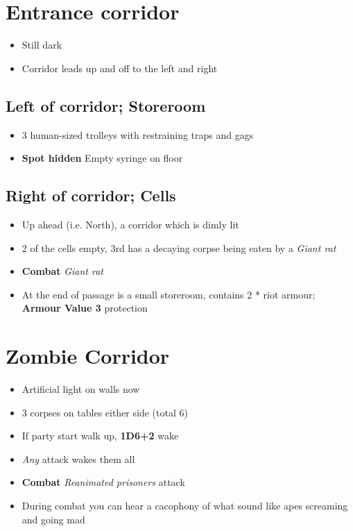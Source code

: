 \documentclass[12pt,a4paper]{article}
\begin{document}
\section*{Entrance corridor}
\begin{itemize}
\item{Still dark}
\item{Corridor leads up and off to the left and right}
\end{itemize}
\subsection*{Left of corridor; Storeroom}
\begin{itemize}
\item{3 human-sized trolleys with restraining traps and gags}
\item{\textbf{Spot hidden} Empty syringe on floor}
\end{itemize}
\subsection*{Right of corridor; Cells}
\begin{itemize}
\item{Up ahead (i.e. North), a corridor which is dimly lit}
\item{2 of the cells empty, 3rd has a decaying corpse being eaten by a \textit{Giant rat}}
\item{\textbf{Combat} \textit{Giant rat}}
\item{At the end of passage is a small storeroom, contains 2 * riot armour; \textbf{Armour Value 3} protection}
\end{itemize}
\section*{Zombie Corridor}
\begin{itemize}
\item{Artificial light on walls now}
\item{3 corpses on tables either side (total 6)}
\item{If party start walk up, \textbf{1D6+2} wake}
\item{\textit{Any} attack wakes them all}
\item{\textbf{Combat} \textit{Reanimated prisoners} attack}
\item{During combat you can hear a cacophony of what sound like apes screaming and going mad}
\end{itemize}
\end{document}
